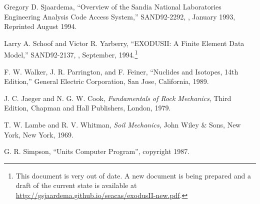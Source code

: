 \begin{thebibliography}{9}

Gregory D. Sjaardema,
``Overview of the Sandia National Laboratories Engineering Analysis Code Access System,''
SAND92-2292,
\SNLA,
January 1993, Reprinted August 1994.

Larry A. Schoof and Victor R. Yarberry, 
``EXODUSII: A Finite Element Data Model,'' 
SAND92-2137, 
\SNLA, 
September, 1994.\footnote{This document is very out of date.  A new
document is being prepared and a draft of the current state is
available at \url{http://gsjaardema.github.io/seacas/exodusII-new.pdf}.}

F. W. Walker, J. R. Parrington, and F. Feiner, ``Nuclides and 
Isotopes, 14th Edition,'' General Electric Corporation, San Jose, California, 1989.

J. C. Jaeger and N. G. W. Cook, \textit{Fundamentals of Rock 
Mechanics}, Third Edition, Chapman and Hall Publishers, London, 1979.

T. W. Lambe and R. V. Whitman, \textit{Soil Mechanics,} John 
Wiley \& Sons, New York, New York, 1969.

G. R. Simpson, ``Units Computer Program'', copyright 1987.


\end{thebibliography}
